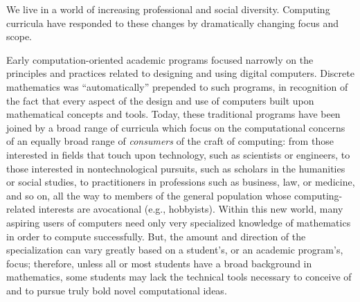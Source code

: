 


We live in a world of increasing professional and social diversity.  Computing curricula have responded to these changes by dramatically changing focus and scope.

\smallskip

Early computation-oriented academic programs focused narrowly on the principles and practices related to designing and using digital computers.  Discrete mathematics was ``automatically'' prepended to such programs, in recognition of the fact that every aspect of the design and use of computers built upon mathematical concepts and tools.  Today, these traditional programs have been joined by a broad range of curricula which focus on the computational concerns of an equally broad range of {\em consumers} of the craft of computing: from those interested in fields that touch upon technology, such as scientists or engineers, to those interested in nontechnological pursuits, such as scholars in the humanities or social studies, to practitioners in professions such as business, law, or medicine, and so on, all the way to members of the general population whose computing-related interests are avocational (e.g., hobbyists).  Within this new world, many aspiring users of computers need only very specialized knowledge of mathematics in order to compute successfully.  But, the amount and direction of the specialization can vary greatly based on a student's, or an academic program's, focus; therefore, unless all or most students have a broad background in mathematics, some students may lack the technical tools necessary to conceive of and to pursue truly bold novel computational ideas.

\bigskip


